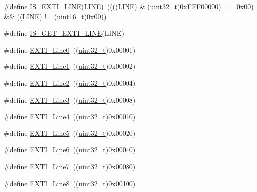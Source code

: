 \begin{DoxyCompactItemize}
\item 
\#define \hyperlink{group___e_x_t_i___lines_gaade8b8717a1d78f83d3cf180e2817557}{I\+S\+\_\+\+E\+X\+T\+I\+\_\+\+L\+I\+NE}(L\+I\+NE)~((((L\+I\+NE) \& (\hyperlink{_p_e___types_8h_a33594304e786b158f3fb30289278f5af}{uint32\+\_\+t})0x\+F\+F\+F00000) == 0x00) \&\& ((\+L\+I\+N\+E) != (uint16\+\_\+t)0x00))
\item 
\#define \hyperlink{group___e_x_t_i___lines_ga77c85c7b8426c6cfe91b4f5a2c58ecda}{I\+S\+\_\+\+G\+E\+T\+\_\+\+E\+X\+T\+I\+\_\+\+L\+I\+NE}(L\+I\+NE)
\item 
\#define \hyperlink{group___e_x_t_i___lines_gac2a65680200dd5f4f7eab29cd4091a75}{E\+X\+T\+I\+\_\+\+Line0}~((\hyperlink{_p_e___types_8h_a33594304e786b158f3fb30289278f5af}{uint32\+\_\+t})0x00001)
\item 
\#define \hyperlink{group___e_x_t_i___lines_gae7c6ab2a0880ce3810641ee0585104cd}{E\+X\+T\+I\+\_\+\+Line1}~((\hyperlink{_p_e___types_8h_a33594304e786b158f3fb30289278f5af}{uint32\+\_\+t})0x00002)
\item 
\#define \hyperlink{group___e_x_t_i___lines_gaec4189bb2709c8c15a0339d1b0b9865a}{E\+X\+T\+I\+\_\+\+Line2}~((\hyperlink{_p_e___types_8h_a33594304e786b158f3fb30289278f5af}{uint32\+\_\+t})0x00004)
\item 
\#define \hyperlink{group___e_x_t_i___lines_gadea3ef6ab7e8bacc686689de8711b98c}{E\+X\+T\+I\+\_\+\+Line3}~((\hyperlink{_p_e___types_8h_a33594304e786b158f3fb30289278f5af}{uint32\+\_\+t})0x00008)
\item 
\#define \hyperlink{group___e_x_t_i___lines_gab33b1fe19306e9e60f8f8d0928b800be}{E\+X\+T\+I\+\_\+\+Line4}~((\hyperlink{_p_e___types_8h_a33594304e786b158f3fb30289278f5af}{uint32\+\_\+t})0x00010)
\item 
\#define \hyperlink{group___e_x_t_i___lines_ga6b4c6292e3abd521cab2bf99d37a15c6}{E\+X\+T\+I\+\_\+\+Line5}~((\hyperlink{_p_e___types_8h_a33594304e786b158f3fb30289278f5af}{uint32\+\_\+t})0x00020)
\item 
\#define \hyperlink{group___e_x_t_i___lines_ga97a5145d1d2612dd53bdd9db3d366873}{E\+X\+T\+I\+\_\+\+Line6}~((\hyperlink{_p_e___types_8h_a33594304e786b158f3fb30289278f5af}{uint32\+\_\+t})0x00040)
\item 
\#define \hyperlink{group___e_x_t_i___lines_ga3b7155d54a4a98394b599718901ccbe5}{E\+X\+T\+I\+\_\+\+Line7}~((\hyperlink{_p_e___types_8h_a33594304e786b158f3fb30289278f5af}{uint32\+\_\+t})0x00080)
\item 
\#define \hyperlink{group___e_x_t_i___lines_gacd51e087a088c3315049394cddf79e88}{E\+X\+T\+I\+\_\+\+Line8}~((\hyperlink{_p_e___types_8h_a33594304e786b158f3fb30289278f5af}{uint32\+\_\+t})0x00100)

\end{DoxyCompactItemize}

